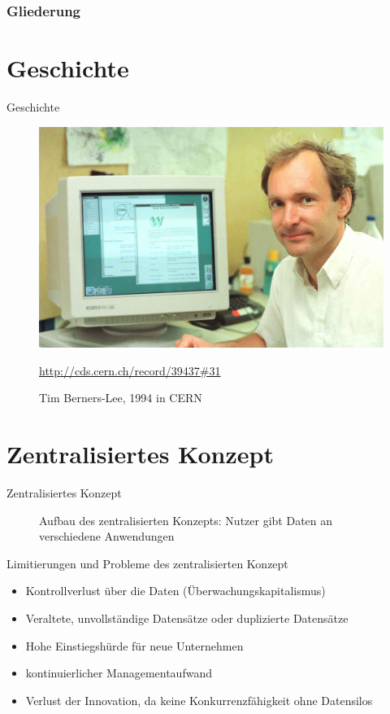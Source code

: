 \documentclass{beamer}              %
\begin{document}
\begin{frame}	
	\frametitle{Gliederung}
	\tableofcontents
\end{frame}

\section{Geschichte}
\begin{frame}{Geschichte}
\begin{figure}[htbp]
    \centering
    \includegraphics[width=0.70\paperwidth]{images/berners-lee.jpg}
    \caption{Tim Berners-Lee, 1994 in CERN}
    \url{http://cds.cern.ch/record/39437\#31}
\end{figure}
\end{frame}

\section{Zentralisiertes Konzept}
\begin{frame}{Zentralisiertes Konzept}
\begin{figure}[htbp]
\centering

 \caption{Aufbau des zentralisierten Konzepts: Nutzer gibt Daten an verschiedene Anwendungen}
 \end{figure}
\end{frame}
\begin{frame}{Limitierungen und Probleme des zentralisierten Konzept}
\begin{itemize}
    \item Kontrollverlust über die Daten (Überwachungskapitalismus) \cite{zuboff2018ueberwachungskapitalismus}
    \item Veraltete, unvollständige Datensätze oder duplizierte Datensätze 
    \item Hohe Einstiegshürde für neue Unternehmen
    \item kontinuierlicher Managementaufwand
    \item Verlust der Innovation, da keine Konkurrenzfähigkeit ohne Datensilos
\end{itemize}
\end{frame}
\end{document}
